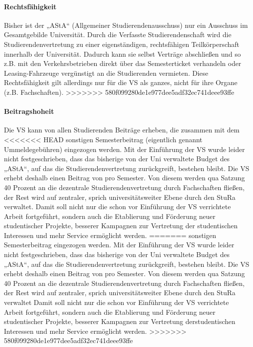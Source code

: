 \paragraph{Rechtsfähigkeit}

Bisher ist der „AStA“ (Allgemeiner Studierendenausschuss) nur ein Ausschuss
im Gesamtgebilde Universität. Durch die Verfasste Studierendenschaft wird
die Studierendenvertretung zu einer eigenständigen, rechtsfähigen Teilkörperschaft
innerhalb der Universität. Dadurch kann sie selbst Verträge abschließen und
so z.B. mit den Verkehrsbetrieben direkt über das Semesterticket verhandeln
oder Leasing-Fahrzeuge vergünstigt an die Studierenden vermieten.
Diese Rechtsfähigkeit gilt allerdings nur für die VS als ganzes,
nicht für ihre Organe (z.B. Fachschaften).
>>>>>>> 580f099280de1e977dee5adf32ec741deee93ffe

\paragraph{Beitragshoheit}

Die VS kann von allen Studierenden Beiträge erheben, die zusammen mit dem
<<<<<<< HEAD
sonstigen Semesterbeitrag (eigentlich genannt Ummeldegebühren) eingezogen
werden. Mit der Einführung der VS wurde leider nicht festgeschrieben, dass das
bisherige von der Uni verwaltete Budget des „AStA“, auf das die
Studierendenvertretung zurückgreift, bestehen bleibt.  Die VS erhebt deshalb
einen Beitrag von  pro Semester. Von diesem werden qua Satzung 40
Prozent an die dezentrale Studierendenvertretung durch Fachschaften fließen,
der Rest wird auf zentraler, sprich universitätsweiter Ebene durch den StuRa
verwaltet. Damit soll nicht nur die schon vor Einführung der VS verrichtete
Arbeit fortgeführt, sondern auch die Etablierung und Förderung neuer
studentischer Projekte, besserer Kampagnen zur Vertretung der studentischen
Interessen und mehr Service ermöglicht werden.
=======
sonstigen Semesterbeitrag eingezogen werden. Mit der Einführung der VS
wurde leider nicht festgeschrieben, dass das bisherige von der Uni verwaltete
Budget des „AStA“, auf das die Studierendenvertretung zurückgreift,
bestehen bleibt. Die VS erhebt deshalb einen Beitrag von  pro 
Semester. Von diesem werden qua Satzung 40 Prozent an die dezentrale 
Studierendenvertretung durch Fachschaften fließen, der Rest wird auf zentraler, 
sprich universitätsweiter Ebene durch den StuRa verwaltet Damit soll nicht 
nur die schon vor Einführung der VS verrichtete Arbeit fortgeführt, sondern 
auch die Etablierung und Förderung neuer studentischer Projekte, besserer 
Kampagnen zur Vertretung derstudentischen Interessen und mehr Service ermöglicht 
werden.
>>>>>>> 580f099280de1e977dee5adf32ec741deee93ffe

